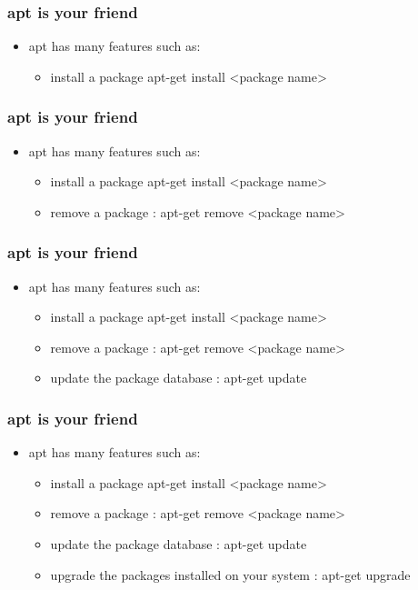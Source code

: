 \begin{frame}
    \frametitle{apt is your friend}
    \begin{itemize}
        \item apt has many features such as:
        \begin{itemize}
            \item install a package apt-get install <package name>
        \end{itemize}
    \end{itemize}
\end{frame}
\begin{frame}
    \frametitle{apt is your friend}
    \begin{itemize}
        \item apt has many features such as:
        \begin{itemize}
            \item install a package apt-get install <package name>
            \item remove a package : apt-get remove <package name>
        \end{itemize}
    \end{itemize}
\end{frame}
\begin{frame}
    \frametitle{apt is your friend}
    \begin{itemize}
        \item apt has many features such as:
        \begin{itemize}
            \item install a package apt-get install <package name>
            \item remove a package : apt-get remove <package name>
            \item update the package database : apt-get update
        \end{itemize}
    \end{itemize}
\end{frame}
\begin{frame}
    \frametitle{apt is your friend}
    \begin{itemize}
        \item apt has many features such as:
        \begin{itemize}
            \item install a package apt-get install <package name>
            \item remove a package : apt-get remove <package name>
            \item update the package database : apt-get update
            \item upgrade the packages installed on your system : apt-get upgrade
        \end{itemize}
    \end{itemize}
\end{frame}
